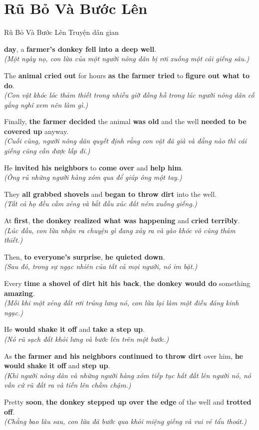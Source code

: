\section{Rũ Bỏ Và Bước Lên}
\begin{truyen}{Rũ Bỏ Và Bước Lên}%
              {Truyện dân gian}

 \textbf{day}, a \textbf{farmer's donkey fell into a deep well}.\\
\textit{(Một ngày nọ, con lừa của một người nông dân bị rơi xuống một cái giếng sâu.)}

The \textbf{animal cried out} for hours \textbf{as the farmer tried} to \textbf{figure out what to do}.\\
\textit{(Con vật khóc lóc thảm thiết trong nhiều giờ đồng hồ trong lúc người nông dân cố gắng nghĩ xem nên làm gì.)}

Finally, \textbf{the farmer decided} the animal \textbf{was old} and the well \textbf{needed to be covered up} anyway.\\
\textit{(Cuối cùng, người nông dân quyết định rằng con vật đã già và đằng nào thì cái giếng cũng cần được lấp đi.)}

He \textbf{invited his neighbors} to \textbf{come over} and \textbf{help him}.\\
\textit{(Ông rủ những người hàng xóm qua để giúp ông một tay.)}

They \textbf{all grabbed shovels} and \textbf{began to throw dirt} into the well.\\
\textit{(Tất cả họ đều cầm xẻng và bắt đầu xúc đất ném xuống giếng.)}

At \textbf{first}, \textbf{the donkey realized what was happening} and \textbf{cried terribly}.\\
\textit{(Lúc đầu, con lừa nhận ra chuyện gì đang xảy ra và gào khóc vô cùng thảm thiết.)}

Then, \textbf{to everyone's surprise}, \textbf{he quieted down}.\\
\textit{(Sau đó, trong sự ngạc nhiên của tất cả mọi người, nó im bặt.)}

Every \textbf{time a shovel of dirt hit his back}, \textbf{the donkey would do} something \textbf{amazing}.\\
\textit{(Mỗi khi một xẻng đất rơi trúng lưng nó, con lừa lại làm một điều đáng kinh ngạc.)}

He \textbf{would shake it off} and \textbf{take a step up}.\\
\textit{(Nó rũ sạch đất khỏi lưng và bước lên trên một bước.)}

As \textbf{the farmer and his neighbors continued to throw dirt} over him, \textbf{he would shake it off} and \textbf{step up}.\\
\textit{(Khi người nông dân và những người hàng xóm tiếp tục hất đất lên người nó, nó vẫn cứ rũ đất ra và tiến lên chầm chậm.)}

Pretty \textbf{soon}, \textbf{the donkey stepped up over the edge} of the well and \textbf{trotted off}.\\
\textit{(Chẳng bao lâu sau, con lừa đã bước qua khỏi miệng giếng và vui vẻ tẩu thoát.)}
\end{truyen}

